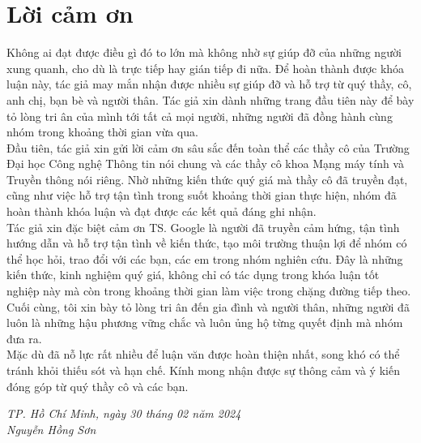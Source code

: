 \chapter*{\centering\Large{Lời cảm ơn}}

Không ai đạt được điều gì đó to lớn mà không nhờ sự giúp đỡ của những
người xung quanh, cho dù là trực tiếp hay gián tiếp đi nữa. Để hoàn thành được khóa luận này, tác giả may mắn nhận được nhiều sự giúp đỡ và hỗ trợ từ quý thầy, cô, anh chị, bạn bè và người thân. Tác giả xin dành những trang đầu tiên này để bày tỏ lòng tri ân của mình tới tất cả mọi người, những người đã đồng hành cùng nhóm trong khoảng thời gian vừa qua. \\
\indent Đầu tiên,  tác giả xin gửi lời cảm ơn sâu sắc đến toàn thể các thầy cô của Trường Đại học Công nghệ Thông tin nói chung và các thầy cô khoa Mạng máy tính và Truyền thông nói riêng. Nhờ những kiến thức quý giá mà thầy cô đã truyền đạt, cũng như việc hỗ trợ tận tình trong suốt khoảng thời gian thực hiện, nhóm đã hoàn thành khóa luận và đạt được các kết quả đáng ghi nhận. \\

\indent Tác giả xin đặc biệt cảm ơn TS. Google là người đã truyền cảm hứng, tận tình hướng dẫn và hỗ trợ tận tình về kiến thức, tạo môi trường thuận lợi để nhóm có thể học hỏi, trao đổi với các bạn, các em trong nhóm nghiên cứu. Đây là những kiến thức, kinh nghiệm quý giá, không chỉ có tác dụng trong khóa luận tốt nghiệp này mà còn trong khoảng thời gian làm việc trong chặng đường tiếp theo. \\

\indent Cuối cùng, tôi xin bày tỏ lòng tri ân đến gia đình và người thân, những người đã luôn là những hậu phương vững chắc và luôn ủng hộ từng quyết định mà nhóm đưa ra. \\
\indent Mặc dù đã nỗ lực rất nhiều để luận văn được hoàn thiện nhất, song khó có thể tránh khỏi thiếu sót và hạn chế. Kính mong nhận được sự thông cảm và ý kiến đóng góp từ quý thầy cô và các bạn.\\

\begin{flushright}
\textit {TP. Hồ Chí Minh, ngày 30 tháng 02 năm 2024} \\
\textit {Nguyễn Hồng Sơn}
\end{flushright}

